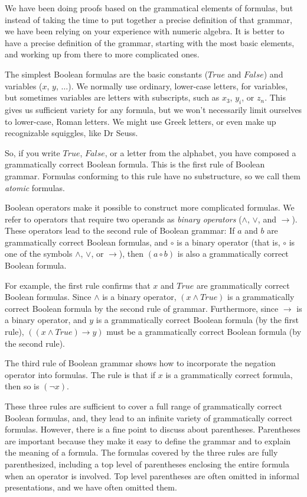 We have been doing proofs based on the grammatical elements of formulas,
but instead of taking the time to put together a precise definition of that grammar,
we have been relying on your experience with numeric algebra.
It is better to have a precise definition of the grammar,
starting with the most basic elements,
and working up from there to more complicated ones.

The simplest Boolean formulas are the basic constants ($True$ and $False$)
and variables ($x$, $y$, $\dots$). We normally use ordinary, lower-case letters,
for variables, but sometimes variables are letters with subscripts,
such as $x_3$, $y_i$, or $z_n$.
This gives us sufficient variety for any formula,
but we won't necessarily limit ourselves to lower-case, Roman letters.
We might use Greek letters, or
even make up recognizable squiggles, like Dr Seuss.

So, if you write $True$, $False$, or a letter from the alphabet,
you have composed a grammatically correct Boolean formula.
This is the first rule of Boolean grammar.
Formulas conforming to this rule have no substructure,
so we call them \emph{atomic} formulas.

Boolean operators make it possible to construct more complicated formulas.
We refer to operators that require two operands as \emph{binary operators }
($\wedge$, $\vee$, and $\rightarrow$).
These operators lead to the second rule of Boolean grammar:
If $a$ and $b$ are grammatically correct Boolean formulas,
 and $\circ$ is a binary operator
 (that is, $\circ$ is one of the symbols $\wedge$, $\vee$, or $\rightarrow$),
 then $(a \circ b)$ is also a grammatically correct Boolean formula.

For example, the first rule confirms that $x$ and $True$ are
grammatically correct Boolean formulas. Since $\wedge$ is a binary operator,
$(x \wedge True)$ is a grammatically correct Boolean formula by the
second rule of grammar. Furthermore, since $\rightarrow$ is a binary operator,
and $y$ is a grammatically correct Boolean formula (by the first rule),
$((x \wedge True) \rightarrow y)$ must be a grammatically correct
Boolean formula (by the second rule).

The third rule of Boolean grammar shows how to incorporate the negation operator into formulas.
The rule is that if $x$ is a grammatically correct formula, then so is $(\neg x)$.

These three rules are sufficient to
cover a full range of grammatically correct Boolean formulas,
and, they lead to an infinite variety of grammatically correct formulas.
However, there is a fine point to discuss about parentheses.
Parentheses are important because they make it easy to define
the grammar and to explain the meaning of a formula.
The formulas covered by the three rules are fully parenthesized,
including a top level of parentheses enclosing the entire formula
when an operator is involved.
Top level parentheses are often omitted in informal presentations,
and we have often omitted them.

